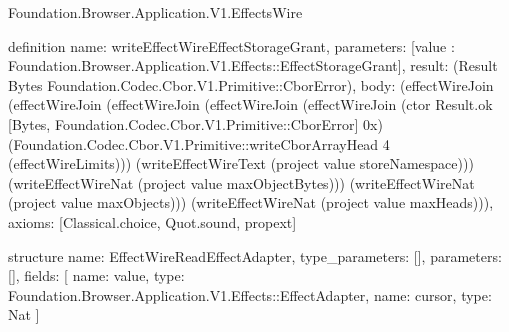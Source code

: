 \begin{lexlean}{Foundation.Browser.Application.V1.EffectsWire}
\begin{semanticmodule}
definition{
  name: writeEffectWireEffectStorageGrant,
  parameters: [value : Foundation.Browser.Application.V1.Effects::EffectStorageGrant],
  result: (Result Bytes Foundation.Codec.Cbor.V1.Primitive::CborError),
  body: (effectWireJoin (effectWireJoin (effectWireJoin (effectWireJoin (effectWireJoin (ctor Result.ok [Bytes, Foundation.Codec.Cbor.V1.Primitive::CborError] 0x) (Foundation.Codec.Cbor.V1.Primitive::writeCborArrayHead 4 (effectWireLimits))) (writeEffectWireText (project value storeNamespace))) (writeEffectWireNat (project value maxObjectBytes))) (writeEffectWireNat (project value maxObjects))) (writeEffectWireNat (project value maxHeads))),
  axioms: [Classical.choice, Quot.sound, propext]
}

structure{
  name: EffectWireReadEffectAdapter,
  type_parameters: [],
  parameters: [],
  fields: [
    {name: value, type: Foundation.Browser.Application.V1.Effects::EffectAdapter},
    {name: cursor, type: Nat}
  ]
}


\end{semanticmodule}
\end{lexlean}
